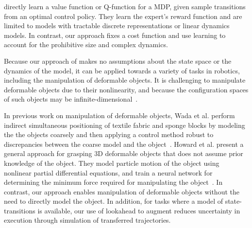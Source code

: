 \citet{Dvijotham_ICML2010} directly
learn a value function or Q-function for a MDP, given sample transitions
from an optimal control policy. They learn the expert's 
reward function and are limited to models with tractable discrete representations 
or linear dynamics models.
In contrast, our approach fixes a cost function 
and use learning to account for the prohibitive size and
complex dynamics.


 
Because our approach of \mmql{} makes no assumptions about the state space
or the dynamics of the model, it can be applied towards a variety of tasks
in robotics, including the manipulation of deformable objects.
It is challenging to manipulate deformable objects due to their nonlinearity,
and because the configuration spaces of such objects may be
infinite-dimensional~\cite{Lamiraux_IJRR2001}.

In previous work on manipulation of deformable objects,
Wada et al. perform indirect simultaneous positioning of
textile fabric and sponge blocks by modeling the
the objects coarsely and then applying a control method robust
to discrepancies between the coarse model and the
object~\cite{Wada_ArticMotion2000}. Howard et al. present a
general approach for grasping 3D deformable objects
that does not assume prior knowledge of the object.
They model particle motion of the object using nonlinear partial differential
equations, and train a neural network for determining the minimum force
required for manipulating the object~\cite{Howard_AutRobots2000}.
In contrast, our approach enables manipulation of deformable objects without
the need to directly model the object. In addition, for tasks
where a model of state-transitions is available, our use of
lookahead to augment \mmql{} reduces uncertainty in execution through
simulation of transferred trajectories.

